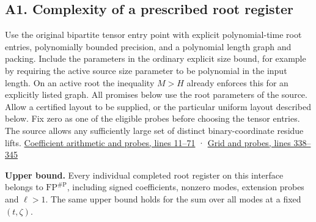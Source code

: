 \documentclass[11pt,a4paper]{article}
\begin{document}
\subsection{A1. Complexity of a prescribed root
register}\label{v9-a1-complexity-of-a-prescribed-root-register}

Use the original bipartite tensor entry point with explicit
polynomial-time root entries, polynomially bounded precision, and a
polynomial length graph and packing. Include the parameters in the
ordinary explicit size bound, for example by requiring the active source
size parameter to be polynomial in the input length. On an active root
the inequality \(M>H\) already enforces this for an explicitly listed
graph. All promises below use the root parameters of the source. Allow a
certified layout to be supplied, or the particular uniform layout
described below. Fix zero as one of the eligible probes before choosing
the tensor entries. The source allows any sufficiently large set of
distinct binary-coordinate residue lifts.
\href{https://github.com/openai/math/blob/main/preprints/The-Exponential-Time-Hypothesis-is-False-October-25-2026/build/quantitative-contraction.tex\#L11}{Coefficient
arithmetic and probes, lines 11--71} ·
\href{https://github.com/openai/math/blob/main/preprints/The-Exponential-Time-Hypothesis-is-False-October-25-2026/build/quantitative-contraction.tex\#L338}{Grid
and probes, lines 338--345}

\textbf{Upper bound.} Every individual completed root register on this
interface belongs to \(\mathrm{FP}^{\#\mathrm P}\), including signed
coefficients, nonzero modes, extension probes and \(\ell>1\). The same
upper bound holds for the sum over all modes at a fixed \((t,\zeta)\).
\end{document}
